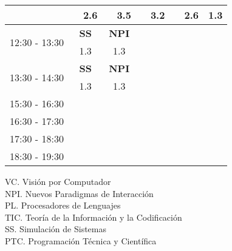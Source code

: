 \documentclass[10pt,spanish, landscape]{article}
\begin{document}
\begin{minipage}{0.7\textwidth}
\begin{tabular}{|c|cc|cc|cc|cc|cc|}
 & {\footnotesize  } & {\footnotesize 2.6} & {\footnotesize  } & {\footnotesize 3.5} & {\footnotesize  } & {\footnotesize 3.2} & {\footnotesize  } & {\footnotesize 2.6}& \multicolumn{2}{|c|}{ \cellcolor{grisclaro} {\footnotesize 1.3}}\\ 
 \hline
\multirow{2}{*}{12:30 - 13:30} & \multicolumn{2}{|c|}{ \cellcolor{grisclaro} \textbf{SS}}& \multicolumn{2}{|c|}{ \cellcolor{grisclaro} \textbf{NPI}} &  &  &  &  &  & \\ 
& \multicolumn{2}{|c|}{ \cellcolor{grisclaro} {\footnotesize 1.3}}& \multicolumn{2}{|c|}{ \cellcolor{grisclaro} {\footnotesize 1.3}} &  &  &  &  &  & \\ 
 \hline
\multirow{2}{*}{13:30 - 14:30} & \multicolumn{2}{|c|}{ \cellcolor{grisclaro} \textbf{SS}}& \multicolumn{2}{|c|}{ \cellcolor{grisclaro} \textbf{NPI}} &  &  &  &  &  & \\ 
& \multicolumn{2}{|c|}{ \cellcolor{grisclaro} {\footnotesize 1.3}}& \multicolumn{2}{|c|}{ \cellcolor{grisclaro} {\footnotesize 1.3}} &  &  &  &  &  & \\ 
 \hline
\multirow{2}{*}{15:30 - 16:30}  &  &  &  &  &  &  &  &  &  & \\ 
 &  &  &  &  &  &  &  &  &  & \\ 
 \hline
\multirow{2}{*}{16:30 - 17:30}  &  &  &  &  &  &  &  &  &  & \\ 
 &  &  &  &  &  &  &  &  &  & \\ 
 \hline
\multirow{2}{*}{17:30 - 18:30}  &  &  &  &  &  &  &  &  &  & \\ 
 &  &  &  &  &  &  &  &  &  & \\ 
 \hline
\multirow{2}{*}{18:30 - 19:30}  &  &  &  &  &  &  &  &  &  & \\ 
 &  &  &  &  &  &  &  &  &  & \\ 
 \hline

\end{tabular}
\end{minipage}
\begin{minipage}{0.25\textwidth}
VC. Visión por Computador\\[0.5cm]
NPI. Nuevos Paradigmas de Interacción\\[0.5cm]
PL. Procesadores de Lenguajes\\[0.5cm]
TIC. Teoría de la Información y la Codificación\\[0.5cm]
SS. Simulación de Sistemas\\[0.5cm]
PTC. Programación Técnica y Científica\\[0.5cm]
\end{minipage}
\newpage
\end{document}
